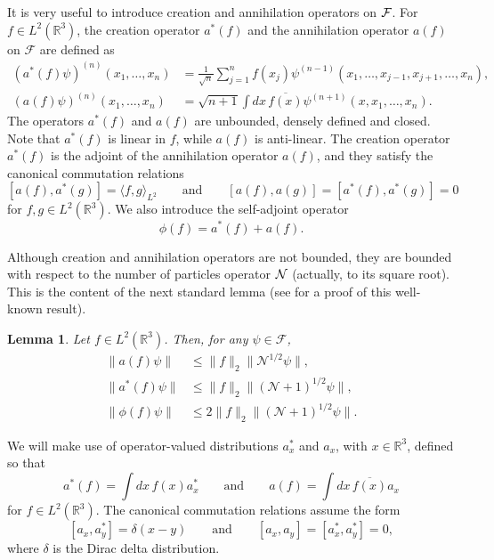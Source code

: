 \documentclass[11pt,a4paper]{article}
\newtheorem{lem}[thm]{Lemma}
\newcommand{\cF}{{\cal F}}
\newcommand{\cN}{{\cal N}}
\newcommand{\R}{\mathbb{R}}
\newcommand{\N}{\mathcal{N}}
\newcommand{\di}{{d}}		%
\newcommand{\Ncal}{\mathcal{N}}		%
\newcommand{\cc}[1]{\overline{#1}}	%
\newcommand{\norm}[1]{\lVert#1\rVert}	%
\begin{document}
It is very useful to introduce creation and annihilation operators on $\cF$. 
For $f \in L^2(\R^3)$, the creation operator $a^*(f)$ and the annihilation
operator $a(f)$ on $\mathcal{F}$ are defined as
\[
  \begin{split}
    (a^*(f) \psi)^{(n)}(x_1, \dots, x_n) & = \frac{1}{\sqrt{n}} \sum_{j=1}^n
    f(x_j) \psi^{(n-1)}(x_1, \dots, x_{j-1}, x_{j+1}, \dots, x_n), \\
    (a(f) \psi)^{(n)}(x_1, \dots, x_n) & = \sqrt{n+1} \int dx \,
    \overline{f(x)} \psi^{(n+1)}(x, x_1, \dots, x_n).
  \end{split}
\]
The operators $a^*(f)$ and $a(f)$ are unbounded, densely defined and closed.
Note that $a^*(f)$ is linear in $f$, while $a(f)$ is anti-linear. The creation
operator $a^*(f)$ is the adjoint of the annihilation operator $a(f)$, and
they satisfy the canonical commutation relations
\begin{equation}\label{eq:ccr}
  [a(f), a^*(g)] = \langle f, g \rangle_{L^2} \qquad \text{and} \qquad [a(f),
  a(g)] = [a^*(f), a^*(g)] = 0
\end{equation}
for $f,g \in L^2(\R^3)$. We also introduce the self-adjoint operator
\[
  \phi(f) = a^*(f) + a(f).
\]

Although creation and annihilation operators are not bounded, they are bounded with respect to the number of particles operator $\cN$ (actually, to its square root). This is the content of the next standard lemma (see \cite{RS} for a proof of this well-known result).
\begin{lem} \label{l:a}
  Let $f \in L^2(\R^3)$. Then, for any $\psi \in
  \mathcal{F}$,
  \begin{equation} \label{aNorm}
    \begin{aligned}
      \norm{a(f)\psi} & \leq \norm{f}_2 \norm{\Ncal^{1/2}\psi}, \\
      \norm{a^*(f)\psi} & \leq \norm{f}_2 \norm{(\Ncal+1)^{1/2}\psi}, \\
      \norm{\phi(f) \psi} & \leq 2 \norm{f}_2 \norm{(\N+1)^{1/2} \psi}.
    \end{aligned}
  \end{equation}
\end{lem}


We will make use of operator-valued distributions $a_x^*$ and $a_x$, with $x
\in \R^3$, defined so that
\[
  a^*(f) = \int \di x\, f(x) a^*_x \qquad \text{and} \qquad a(f) = \int \di
  x\, \cc{f(x)} a_x
\]
for $f \in L^2(\R^3)$. The canonical commutation
relations assume the form
\[
  [a_x, a_y^*] = \delta(x-y) \qquad \text{and} \qquad [a_x, a_y] = [a_x^*,
  a_y^*] = 0,
\]
where $\delta$ is the Dirac delta distribution.
\end{document}
